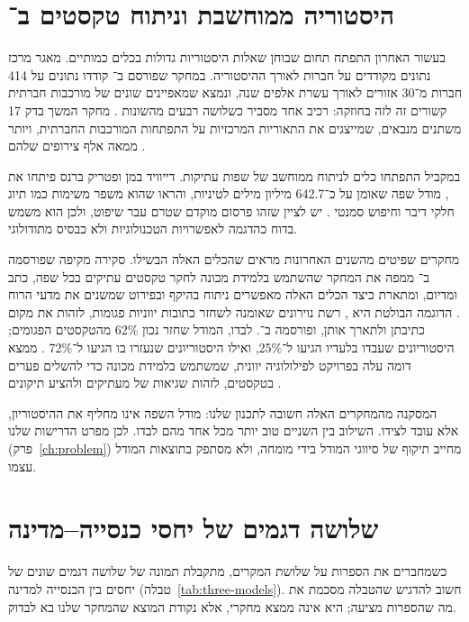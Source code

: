 \section{היסטוריה ממוחשבת וניתוח טקסטים ב־}
\label{sec:lit-computational}

בעשור האחרון התפתח תחום שבוחן שאלות היסטוריות גדולות בכלים כמותיים. מאגר  מרכז נתונים מקודדים על חברות לאורך ההיסטוריה. במחקר שפורסם ב־ קודדו נתונים על 414 חברות מ־30 אזורים לאורך עשרת אלפים שנה, ונמצא שמאפיינים שונים של מורכבות חברתית קשורים זה לזה בחוזקה: רכיב אחד מסביר כשלושה רבעים מהשונות \cite{turchin2018quantitative}. מחקר המשך בדק 17 משתנים מנבאים, שמייצגים את התאוריות המרכזיות על התפתחות המורכבות החברתית, ויותר ממאה אלף צירופים שלהם \cite{turchin2022disentangling}.

במקביל התפתחו כלים לניתוח ממוחשב של שפות עתיקות. דייוויד במן ופטריק ברנס פיתחו את , מודל שפה שאומן על כ־642.7 מיליון מילים לטיניות, והראו שהוא משפר משימות כמו תיוג חלקי דיבר וחיפוש סמנטי \cite{bamman2020latinbert}. יש לציין שזהו פרסום מוקדם שטרם עבר שיפוט, ולכן הוא משמש בדוח כהדגמה לאפשרויות הטכנולוגיות ולא כבסיס מתודולוגי.

מחקרים שפיטים מהשנים האחרונות מראים שהכלים האלה הבשילו. סקירה מקיפה שפורסמה ב־ ממפה את המחקר שהשתמש בלמידת מכונה לחקר טקסטים עתיקים בכל שפה, כתב ומדיום, ומתארת כיצד הכלים האלה מאפשרים ניתוח בהיקף ובפירוט שמשנים את מדעי הרוח \cite{sommerschield2023survey}. הדוגמה הבולטת היא , רשת נוירונים שאומנה לשחזר כתובות יווניות פגומות, לזהות את מקום כתיבתן ולתארך אותן, ופורסמה ב־. לבדו, המודל שחזר נכון 62\% מהטקסטים הפגומים; היסטוריונים שעבדו בלעדיו הגיעו ל־25\%, ואילו היסטוריונים שנעזרו בו הגיעו ל־72\% \cite{assael2022ithaca}. ממצא דומה עלה בפרויקט  לפילולוגיה יוונית, שמשתמש בלמידת מכונה כדי להשלים פערים בטקסטים, לזהות שגיאות של מעתיקים ולהציע תיקונים \cite{graziosi2023philology}.

המסקנה מהמחקרים האלה חשובה לתכנון שלנו: מודל השפה אינו מחליף את ההיסטוריון, אלא עובד לצידו. השילוב בין השניים טוב יותר מכל אחד מהם לבדו. לכן מפרט הדרישות שלנו (פרק~\ref{ch:problem}) מחייב תיקוף של סיווגי המודל בידי מומחה, ולא מסתפק בתוצאות המודל עצמו.

\section{שלושה דגמים של יחסי כנסייה–מדינה}
\label{sec:lit-models}

כשמחברים את הספרות על שלושת המקרים, מתקבלת תמונה של שלושה דגמים שונים של יחסים בין הכנסייה למדינה (טבלה~\ref{tab:three-models}). חשוב להדגיש שהטבלה מסכמת את מה שהספרות מציעה; היא אינה ממצא מחקרי, אלא נקודת המוצא שהמחקר שלנו בא לבדוק.

